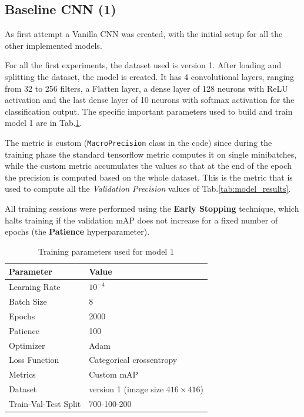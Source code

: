 \documentclass[a4paper,12pt]{article}
\begin{document}
\subsection{Baseline CNN (1)}
As first attempt a Vanilla CNN was created, with the initial setup for all the other implemented models.

For all the first experiments, the dataset used is version 1. After loading and splitting the dataset, the model is created. It has 4 convolutional layers, ranging from 32 to 256 filters, a Flatten layer, a dense layer of 128 neurons with ReLU activation and the last dense layer of 10 neurons with softmax activation for the classification output. The specific important parameters used to build and train model 1 are in Tab.\ref{tab:training-params-cnn-vanilla}.

The metric is custom (\texttt{MacroPrecision} class in the code) since during the training phase the standard tensorflow metric computes it on single minibatches, while the custom metric accumulates the values so that at the end of the epoch the precision is computed based on the whole dataset. This is the metric that is used to compute all the \textit{Validation Precision} values of Tab.\ref{tab:model_results}.

All training sessions were performed using the \textbf{Early Stopping} technique, which halts training if the validation mAP does not increase for a fixed number of epochs (the \textbf{Patience} hyperparameter).


\begin{table}[h]
	\centering
	\begin{tabular}{ll}
		\toprule
		\textbf{Parameter} & \textbf{Value} \\
		\midrule
		Learning Rate & $ 10^{-4} $ \\
		Batch Size & 8 \\
		Epochs & 2000 \\
		Patience & 100 \\
		Optimizer & Adam \\
		Loss Function & Categorical crossentropy\\
		Metrics & Custom mAP \\
		Dataset & version 1 (image size $ 416 \times 416 $) \\
		Train-Val-Test Split & 700-100-200 \\
		\bottomrule
	\end{tabular}
	\caption{Training parameters used for model 1}
	\label{tab:training-params-cnn-vanilla}
\end{table}
\end{document}
